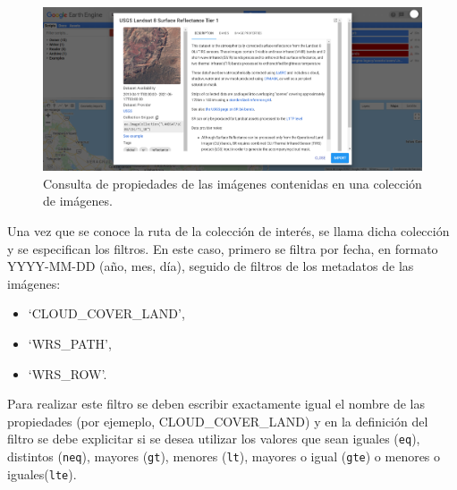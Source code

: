 \documentclass[
  12pt,
  letterpaper,
  twoside]{book}
\providecommand{\tightlist}{%
  \setlength{\itemsep}{0pt}\setlength{\parskip}{0pt}}
\begin{document}
\begin{figure}[btp]

{\centering \includegraphics[width=1\linewidth]{Img/Ruta_coleccion} 

}

\caption{Consulta de propiedades de las imágenes contenidas en una colección de imágenes.}\label{fig:unnamed-chunk-147}
\end{figure}

Una vez que se conoce la ruta de la colección de interés, se llama dicha colección y se especifican los filtros. En este caso, primero se filtra por fecha, en formato YYYY-MM-DD (año, mes, día), seguido de filtros de los metadatos de las imágenes:

\begin{itemize}
\tightlist
\item
  `CLOUD\_COVER\_LAND',
\item
  `WRS\_PATH',
\item
  `WRS\_ROW'.
\end{itemize}

Para realizar este filtro se deben escribir exactamente igual el nombre de las propiedades (por ejemeplo, CLOUD\_COVER\_LAND) y en la definición del filtro se debe explicitar si se desea utilizar los valores que sean iguales (\texttt{eq}), distintos (\texttt{neq}), mayores (\texttt{gt}), menores (\texttt{lt}), mayores o igual (\texttt{gte}) o menores o iguales(\texttt{lte}).
\end{document}
